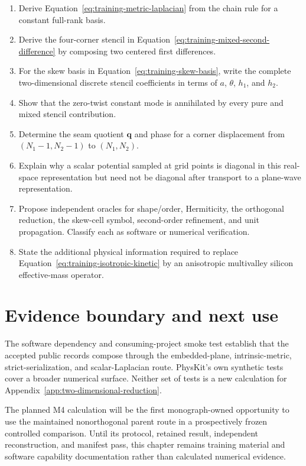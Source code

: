 \begin{enumerate}
  \item Derive Equation~\eqref{eq:training-metric-laplacian} from the chain rule
        for a constant full-rank basis.
  \item Derive the four-corner stencil in
        Equation~\eqref{eq:training-mixed-second-difference} by composing two
        centered first differences.
  \item For the skew basis in
        Equation~\eqref{eq:training-skew-basis}, write the complete
        two-dimensional discrete stencil coefficients in terms of $a$,
        $\theta$, $h_1$, and $h_2$.
  \item Show that the zero-twist constant mode is annihilated by every pure and
        mixed stencil contribution.
  \item Determine the seam quotient $\mathbf q$ and phase for a corner
        displacement from $(N_1-1,N_2-1)$ to
        $(N_1,N_2)$.
  \item Explain why a scalar potential sampled at grid points is diagonal in
        this real-space representation but need not be diagonal after transport
        to a plane-wave representation.
  \item Propose independent oracles for shape/order, Hermiticity, the orthogonal
        reduction, the skew-cell symbol, second-order refinement, and unit
        propagation. Classify each as software or numerical verification.
  \item State the additional physical information required to replace
        Equation~\eqref{eq:training-isotropic-kinetic} by an anisotropic
        multivalley silicon effective-mass operator.
\end{enumerate}

\section{Evidence boundary and next use}

The software dependency and consuming-project smoke test establish that the
accepted public records compose through the embedded-plane, intrinsic-metric,
strict-serialization, and scalar-Laplacian route. PhysKit's own synthetic tests
cover a broader numerical surface. Neither set of tests is a new calculation
for Appendix~\ref{app:two-dimensional-reduction}.

The planned M4 calculation will be the first monograph-owned opportunity to use
the maintained nonorthogonal parent route in a prospectively frozen controlled
comparison. Until its protocol, retained result, independent reconstruction,
and manifest pass, this chapter remains training material and software
capability documentation rather than calculated numerical evidence.
